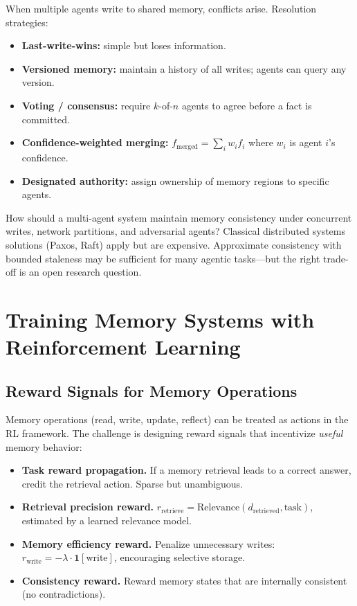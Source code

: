 When multiple agents write to shared memory, conflicts arise. Resolution strategies:

\begin{itemize}
  \item \textbf{Last-write-wins:} simple but loses information.
  \item \textbf{Versioned memory:} maintain a history of all writes; agents can query any version.
  \item \textbf{Voting / consensus:} require $k$-of-$n$ agents to agree before a fact is committed.
  \item \textbf{Confidence-weighted merging:} $f_\text{merged} = \sum_i w_i f_i$ where $w_i$ is agent $i$’s confidence.
  \item \textbf{Designated authority:} assign ownership of memory regions to specific agents.
\end{itemize}

\begin{questionbox}
How should a multi-agent system maintain memory consistency under concurrent writes, network partitions, and adversarial agents? Classical distributed systems solutions (Paxos, Raft) apply but are expensive. Approximate consistency with bounded staleness may be sufficient for many agentic tasks---but the right trade-off is an open research question.
\end{questionbox}

\section{Training Memory Systems with Reinforcement Learning}
\label{sec:rl-memory}

\subsection{Reward Signals for Memory Operations}
\label{reward-signals-for-memory-operations}

Memory operations (read, write, update, reflect) can be treated as actions in the RL framework. The challenge is designing reward signals that incentivize \emph{useful} memory behavior:

\begin{itemize}
  \item \textbf{Task reward propagation.} If a memory retrieval leads to a correct answer, credit the retrieval action. Sparse but unambiguous.
  \item \textbf{Retrieval precision reward.} $r_\text{retrieve} = \text{Relevance}(d_\text{retrieved}, \text{task})$, estimated by a learned relevance model.
  \item \textbf{Memory efficiency reward.} Penalize unnecessary writes: $r_\text{write} = -\lambda \cdot \mathbf{1}[\text{write}]$, encouraging selective storage.
  \item \textbf{Consistency reward.} Reward memory states that are internally consistent (no contradictions).
\end{itemize}

